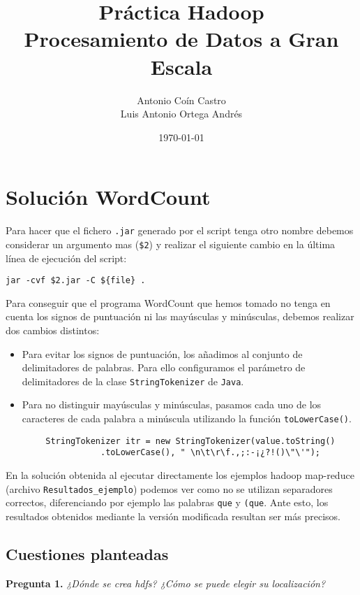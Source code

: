 \documentclass[11pt]{article}
\author{Antonio Coín Castro\\ Luis Antonio Ortega Andrés}
\date{\today}
\title{Práctica Hadoop\\\medskip
\large Procesamiento de Datos a Gran Escala}
\begin{document}
\maketitle

\section*{Solución WordCount}

Para hacer que el fichero \texttt{.jar} generado por el script tenga otro nombre debemos considerar un argumento mas (\texttt{\$2}) y realizar el siguiente cambio en la última línea de ejecución del script:

\begin{verbatim}
jar -cvf $2.jar -C ${file} .
\end{verbatim}


Para conseguir que el programa WordCount que hemos tomado no tenga en cuenta los signos de puntuación ni las mayúsculas y minúsculas, debemos realizar dos cambios distintos:
\begin{itemize}
  \item Para evitar los signos de puntuación, los añadimos al conjunto de delimitadores de palabras. Para ello configuramos el parámetro de delimitadores de la clase \texttt{StringTokenizer} de \texttt{Java}.
  \item Para no distinguir mayúsculas y minúsculas, pasamos cada uno de los caracteres de cada palabra a minúscula utilizando la función \texttt{toLowerCase()}.
\end{itemize}
  \begin{verbatim}
        StringTokenizer itr = new StringTokenizer(value.toString()
                   .toLowerCase(), " \n\t\r\f.,;:-¡¿?!()\"\'");
\end{verbatim}

En la solución obtenida al ejecutar directamente los ejemplos hadoop map-reduce (archivo \texttt{Resultados\_ejemplo}) podemos ver como no se utilizan separadores correctos, diferenciando por ejemplo las palabras \texttt{que} y \texttt{(que}. Ante esto, los resultados obtenidos mediante la versión modificada resultan ser más precisos.

\subsection*{Cuestiones planteadas}

\textbf{Pregunta 1. }\textit{¿Dónde se crea hdfs? ¿Cómo se puede elegir su localización?}\\
\end{document}
